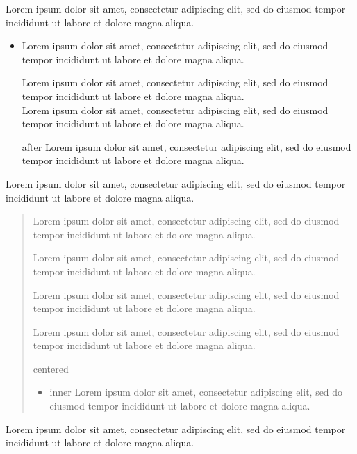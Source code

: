 \documentclass[11pt]{article}
\begin{document}
Lorem ipsum dolor sit amet, consectetur adipiscing elit, sed do eiusmod tempor incididunt ut labore et dolore magna aliqua.
\begin{itemize}[nosep, leftmargin=*]
\item Lorem ipsum dolor sit amet, consectetur adipiscing elit, sed do eiusmod tempor incididunt ut labore et dolore magna aliqua.
\begin{flushleft}
Lorem ipsum dolor sit amet, consectetur adipiscing elit, sed do eiusmod tempor incididunt ut labore et dolore magna aliqua. \\
Lorem ipsum dolor sit amet, consectetur adipiscing elit, sed do eiusmod tempor incididunt ut labore et dolore magna aliqua.
\end{flushleft}
after Lorem ipsum dolor sit amet, consectetur adipiscing elit, sed do eiusmod tempor incididunt ut labore et dolore magna aliqua.
\end{itemize}

Lorem ipsum dolor sit amet, consectetur adipiscing elit, sed do eiusmod tempor incididunt ut labore et dolore magna aliqua.
\begin{quotation}
Lorem ipsum dolor sit amet, consectetur adipiscing elit, sed do eiusmod tempor incididunt ut labore et dolore magna aliqua.
\begin{flushright}
Lorem ipsum dolor sit amet, consectetur adipiscing elit, sed do eiusmod tempor incididunt ut labore et dolore magna aliqua.

Lorem ipsum dolor sit amet, consectetur adipiscing elit, sed do eiusmod tempor incididunt ut labore et dolore magna aliqua.
\end{flushright}
Lorem ipsum dolor sit amet, consectetur adipiscing elit, sed do eiusmod tempor incididunt ut labore et dolore magna aliqua.
\begin{center}
centered
\begin{itemize}\item inner Lorem ipsum dolor sit amet, consectetur adipiscing elit, sed do eiusmod tempor incididunt ut labore et dolore magna aliqua.\end{itemize}
\end{center}
\end{quotation}
Lorem ipsum dolor sit amet, consectetur adipiscing elit, sed do eiusmod tempor incididunt ut labore et dolore magna aliqua.
\end{document}
